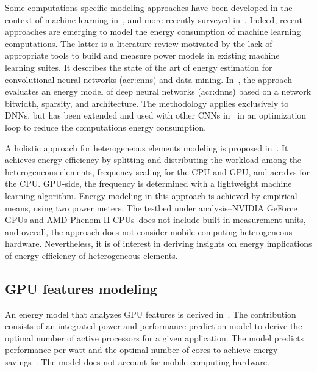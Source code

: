 Some computations-specific modeling approaches have been developed in the context of machine learning in~\citep{yang2017method}, and more recently surveyed in~\citep{garcia2019estimation}. Indeed, recent approaches are emerging to model the energy consumption of machine learning computations. The latter is a literature review motivated by the lack of appropriate tools to build and measure power models in existing machine learning suites. It describes the state of the art of energy estimation for convolutional neural networks (\Gls{acr:cnn}s) and data mining. In~\citep{yang2017method}, the approach evaluates an energy model of deep neural networks (\Gls{acr:dnn}s) based on a network bitwidth, sparsity, and architecture. The methodology applies exclusively to DNNs, but has been extended and used with other CNNs in~\citep{yang2017designing} in an optimization loop to reduce the computations energy consumption.

A holistic approach for heterogeneous elements modeling is proposed in~\citep{ma2012holistic}. It achieves energy efficiency by splitting and distributing the workload among the heterogeneous elements, frequency scaling for the CPU and GPU, and \Gls{acr:dvs} for the CPU. GPU-side, the frequency is determined with a lightweight machine learning algorithm. Energy modeling in this approach is achieved by empirical means, using two power meters. The testbed under analysis--NVIDIA GeForce GPUs and AMD Phenom II CPUs--does not include built-in measurement units, and overall, the approach does not consider mobile computing heterogeneous hardware. Nevertheless, it is of interest in deriving insights on energy implications of energy efficiency of heterogeneous elements. 


\subsection{GPU features modeling}

An energy model that analyzes GPU features is derived in~\citep{hong2010integrated}. The contribution consists of an integrated power and performance prediction model to derive the optimal number of active processors for a given application. The model predicts performance per watt and the optimal number of cores to achieve energy savings~\citep{hong2010integrated}. The model does not account for mobile computing hardware.

